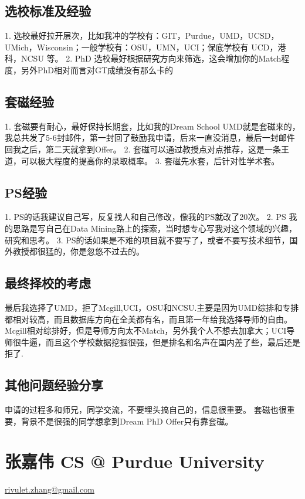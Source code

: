 \documentclass[11pt,fleqn,openany]{book} %
\begin{document}
\subsection*{选校标准及经验}
1. 选校最好拉开层次，比如我冲的学校有：GIT，Purdue，UMD，UCSD，UMich，Wisconsin；一般学校有：OSU，UMN，UCI；保底学校有 UCD，港科，NCSU 等。
2. PhD 选校最好根据研究方向来筛选，这会增加你的Match程度，另外PhD相对而言对GT成绩没有那么卡的
\subsection*{套磁经验}
1. 套磁要有耐心，最好保持长期套，比如我的Dream School UMD就是套磁来的，我总共发了5-6封邮件，第一封回了鼓励我申请，后来一直没消息，最后一封邮件回我之后，第二天就拿到Offer。
2. 套磁可以通过教授点对点推荐，这是一条王道，可以极大程度的提高你的录取概率。
3. 套磁先水套，后针对性学术套。
\subsection*{PS经验}
1. PS的话我建议自己写，反复找人和自己修改，像我的PS就改了20次。
2. PS 我的思路是写自己在Data Mining路上的探索，当时想专心写我对这个领域的兴趣，研究和思考。
3. PS的话如果是不难的项目就不要写了，或者不要写技术细节，国外教授都很猛的，你是忽悠不过去的。
\subsection*{最终择校的考虑}
最后我选择了UMD，拒了Mcgill,UCI，OSU和NCSU.主要是因为UMD综排和专排都相对较高，而且数据库方向在全美都有名，而且第一年给我选择导师的自由。Mcgill相对综排好，但是导师方向太不Match，另外我个人不想去加拿大；UCI导师很牛逼，而且这个学校数据挖掘很强，但是排名和名声在国内差了些，最后还是拒了.
\subsection*{其他问题经验分享}
申请的过程多和师兄，同学交流，不要埋头搞自己的，信息很重要。
套磁也很重要，背景不是很强的同学想拿到Dream PhD Offer只有靠套磁。
\clearpage
\section{张嘉伟 CS @ Purdue University}
\hfill \href{mailto:rivulet.zhang@gmail.com}{rivulet.zhang@gmail.com}
\end{document}
